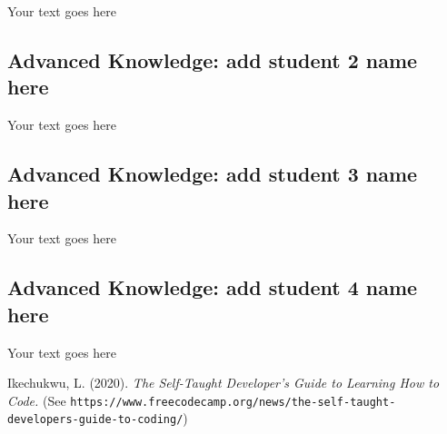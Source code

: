 \documentclass[a4paper, 11pt]{report}
\begin{document}
Your text goes here

\subsection{Advanced Knowledge: add student 2 name here}

Your text goes here

\subsection{Advanced Knowledge: add student 3 name here}

Your text goes here

\subsection{Advanced Knowledge: add student 4 name here}

Your text goes here




\newpage




Ikechukwu, L. (2020). \textit{The Self-Taught Developer's Guide to Learning How to Code.} (See \texttt{https://www.freecodecamp.org/news/the-self-taught-developers-guide-to-coding/})
\end{document}
